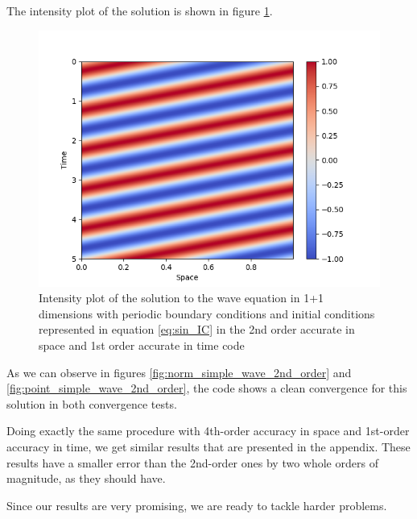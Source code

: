 The intensity plot of the solution is shown in figure \ref{fig:intensity_simple_wave_2nd_order}.

\begin{figure}[t!]
    \centering
    \includegraphics[width=\columnwidth]{Images/simple_wave-2nd_order-Intensity.png}
    \caption{Intensity plot of the solution to the wave equation in 1+1 dimensions with periodic boundary conditions and initial conditions represented in equation \eqref{eq:sin_IC} in the 2nd order accurate in space and 1st order accurate in time code}
    \label{fig:intensity_simple_wave_2nd_order}
\end{figure}

As we can observe in figures \ref{fig:norm_simple_wave_2nd_order} and \ref{fig:point_simple_wave_2nd_order}, the code shows a clean convergence for this solution in both convergence tests. 

Doing exactly the same procedure with 4th-order accuracy in space and 1st-order accuracy in time, we get similar results that are presented in the appendix. These results have a smaller error than the 2nd-order ones by two whole orders of magnitude, as they should have.

Since our results are very promising, we are ready to tackle harder problems.
